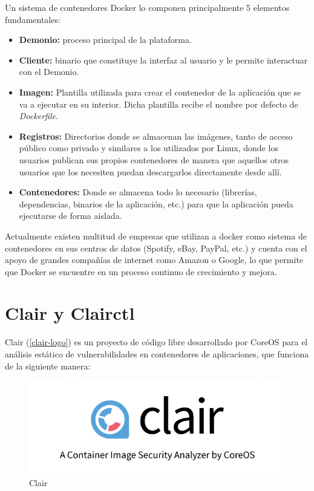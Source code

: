 Un sistema de contenedores Docker lo componen principalmente 5 elementos fundamentales:

\begin{itemize}
	\item \textbf{Demonio:} proceso principal de la plataforma.
	\item \textbf{Cliente:} binario que constituye la interfaz al usuario y le permite interactuar con el Demonio.
	\item \textbf{Imagen:} Plantilla utilizada para crear el contenedor de la aplicación que se va a ejecutar en su interior. Dicha plantilla recibe el nombre por defecto de \textit{Dockerfile}.
	\item \textbf{Registros:} Directorios donde se almacenan las imágenes, tanto de acceso público como privado y similares a los utilizados por Linux, donde los usuarios publican sus propios contenedores de manera que aquellos otros usuarios que los necesiten puedan descargarlos directamente desde allí.
	\item \textbf{Contenedores:} Donde se almacena todo lo necesario (librerías, dependencias, binarios de la aplicación, etc.) para que la aplicación pueda ejecutarse de forma aislada.
\end{itemize}

Actualmente existen multitud de empresas que utilizan a docker como sistema de contenedores en sus centros de datos (Spotify, eBay, PayPal, etc.) y cuenta con el apoyo de grandes compañías de internet como Amazon o Google, lo que permite que Docker se encuentre en un proceso continuo de crecimiento y mejora.


\section{Clair y Clairctl}

Clair (\autoref{clair-logo}) es un proyecto de código libre desarrollado por CoreOS para el análisis estático de vulnerabilidades en contenedores de aplicaciones, que funciona de la siguiente manera\cite{clair2017}:

\begin{figure}[htbp]
	\centering
	\includegraphics[width=0.80\linewidth]
	{entorno/figuras/clair.png}
	\caption{Clair}
	\label{clair-logo}
\end{figure}

